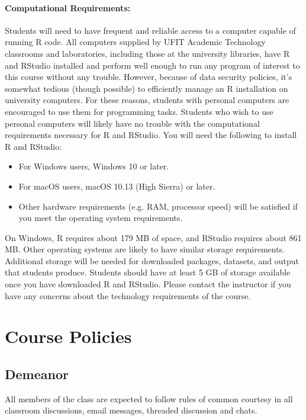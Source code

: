\documentclass[11pt]{article}
\begin{document}
\paragraph{Computational Requirements:} 
Students will need to have frequent and reliable access to a computer capable of running R code. All computers supplied by UFIT Academic Technology classrooms and laboratories, including those at the university libraries, have R and RStudio installed and perform well enough to run any program of interest to this course without any trouble. However, because of data security policies, it’s somewhat tedious (though possible) to efficiently manage an R installation on university computers. For these reasons, students with personal computers are encouraged to use them for programming tasks. Students who wish to use personal computers will likely have no trouble with the computational requirements necessary for R and RStudio. You will need the following to install R and RStudio:
\begin{itemize}
	\item For Windows users, Windows 10 or later.
	\item For macOS users, macOS 10.13 (High Sierra) or later.
	\item Other hardware requirements (e.g. RAM, processor speed) will be satisfied if you meet the operating system requirements.
\end{itemize}
On Windows, R requires about 179 MB of space, and RStudio requires about 861 MB. Other operating systems are likely to have similar storage requirements. Additional storage will be needed for downloaded packages, datasets, and output that students produce. Students should have at least 5 GB of storage available once you have downloaded R and RStudio. Please contact the instructor if you have any concerns about the technology requirements of the course.


	
\section*{Course Policies}

\subsection*{Demeanor}
All members of the class are expected to follow rules of common courtesy in all classroom discussions, email messages, threaded discussion and chats.  
\end{document}
